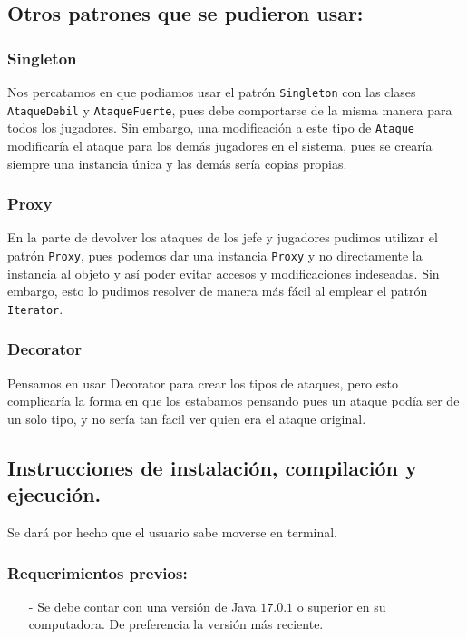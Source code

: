 \documentclass{article}
\newcommand{\code}[1]{\textcolor{white!25!black}{\texttt{#1}}}
\begin{document}
\subsection*{Otros patrones que se pudieron usar:}
\subsubsection*{Singleton}
Nos percatamos en que podiamos usar el patrón \code{Singleton} con las clases
\code{AtaqueDebil} y \code{AtaqueFuerte}, pues debe comportarse de la misma
manera para todos los jugadores. Sin embargo, una modificación a este tipo
de \code{Ataque} modificaría el ataque para los demás jugadores en el sistema,
pues se crearía siempre una instancia única y las demás sería copias propias.

\subsubsection*{Proxy}
En la parte de devolver los ataques de los jefe y jugadores pudimos utilizar el
patrón \code{Proxy}, pues podemos dar una instancia \code{Proxy} y no directamente
la instancia al objeto y así poder evitar accesos y modificaciones indeseadas.
Sin embargo, esto lo pudimos resolver de manera más fácil al emplear el patrón
\code{Iterator}.

\subsubsection*{Decorator}
Pensamos en usar Decorator para crear los tipos de ataques, pero esto complicaría la forma en que los estabamos pensando pues un ataque podía ser de un solo tipo, y no sería tan facil ver quien era el ataque original.


\newpage
\subsection*{Instrucciones de instalación, compilación y ejecución.}
Se dará por hecho que el usuario sabe moverse en terminal.

\subsubsection*{Requerimientos previos:}
\begin{itemize}
\item[-] Se debe contar con una versión de Java $17.0.1$ o superior en
  su computadora. De preferencia la versión más reciente.
\end{itemize}
\end{document}

